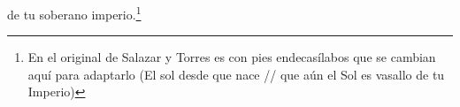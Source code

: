 de tu soberano imperio.\footnote{\textsuperscript{}En el original de Salazar y Torres es con pies endecasílabos que se cambian aquí para adaptarlo (El sol desde que nace // que aún el Sol es vasallo de tu Imperio)}
